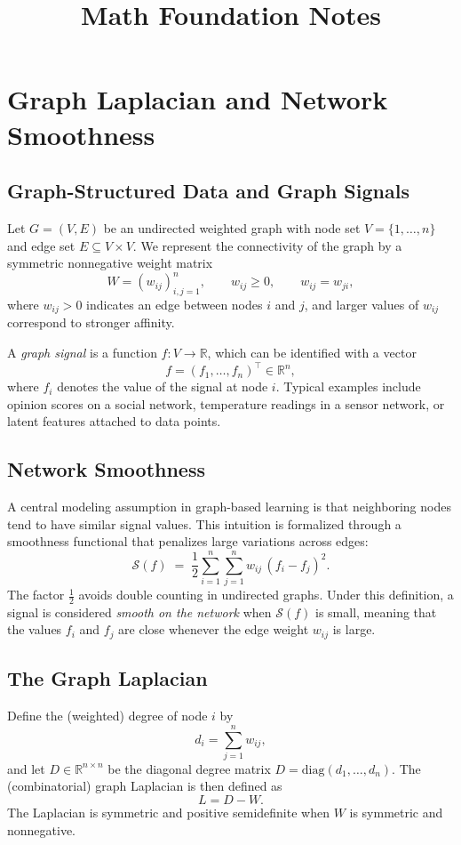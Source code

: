 \documentclass[11pt]{article}
\title{Math Foundation Notes}
\author{}
\date{}
\begin{document}
\maketitle

\section{Graph Laplacian and Network Smoothness}

\subsection{Graph-Structured Data and Graph Signals}
Let \(G=(V,E)\) be an undirected weighted graph with node set \(V=\{1,\dots,n\}\) and edge set \(E\subseteq V\times V\).
We represent the connectivity of the graph by a symmetric nonnegative weight matrix
\[
W = (w_{ij})_{i,j=1}^n,\qquad w_{ij}\ge 0,\qquad w_{ij}=w_{ji},
\]
where \(w_{ij}>0\) indicates an edge between nodes \(i\) and \(j\), and larger values of \(w_{ij}\) correspond to stronger affinity.

A \emph{graph signal} is a function \(f:V\to \mathbb{R}\), which can be identified with a vector
\[
f = (f_1,\dots,f_n)^\top \in \mathbb{R}^n,
\]
where \(f_i\) denotes the value of the signal at node \(i\). Typical examples include opinion scores on a social network, temperature readings in a sensor network, or latent features attached to data points.

\subsection{Network Smoothness}
A central modeling assumption in graph-based learning is that neighboring nodes tend to have similar signal values. This intuition is formalized through a smoothness functional that penalizes large variations across edges:
\[
\mathcal{S}(f)
\;=\;
\frac{1}{2}\sum_{i=1}^n\sum_{j=1}^n w_{ij}\,(f_i-f_j)^2.
\]
The factor \(\tfrac{1}{2}\) avoids double counting in undirected graphs.
Under this definition, a signal is considered \emph{smooth on the network} when \(\mathcal{S}(f)\) is small, meaning that the values \(f_i\) and \(f_j\) are close whenever the edge weight \(w_{ij}\) is large.

\subsection{The Graph Laplacian}
Define the (weighted) degree of node \(i\) by
\[
d_i = \sum_{j=1}^n w_{ij},
\]
and let \(D\in\mathbb{R}^{n\times n}\) be the diagonal degree matrix \(D=\mathrm{diag}(d_1,\dots,d_n)\).
The (combinatorial) graph Laplacian is then defined as
\[
L = D - W.
\]
The Laplacian is symmetric and positive semidefinite when \(W\) is symmetric and nonnegative.
\end{document}
